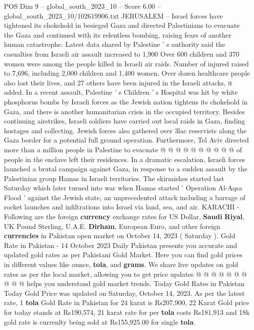 \begin{textsample}{POS Dim 9 – global\_south\_2023\_10 – Score 6.00 – global\_south\_2023\_10/102619906.txt}  \label{ex:f9_pos_081}
JERUSALEM -- Israel forces have tightened its chokehold in besieged Gaza and directed Palestinians to evacuate the Gaza and continued with its relentless bombing, raising fears of another human catastrophe.
Latest data shared by Palestine ' s authority said the casualties from Israeli air assault increased to 1,900 Over 600 children and 370 women were among the people killed in Israeli air raids.
Number of injured raised to 7,696, including 2,000 children and 1,400 women.
Over dozen healthcare people also lost their lives, and 27 others have been injured in the Israeli attacks, it added.
In a recent assault, Palestine ' s Children ' s Hospital was hit by white phosphorus bombs by Israeli forces as the Jewish nation tightens its chokehold in Gaza, and there is another humanitarian crisis in the occupied territory.
Besides continuing airstrikes, Israeli soldiers have carried out local raids in Gaza, finding hostages and collecting.
Jewish forces also gathered over 3lac reservists along the Gaza border for a potential full ground operation.
Furthermore, Tel Aviv directed more than a million people in Palestine to evacuate @ @ @ @ @ @ @ @ @ @ of people in the enclave left their residences.
In a dramatic escalation, Israeli forces launched a brutal campaign against Gaza, in response to a sudden assault by the Palestinian group Hamas in Israeli territories.
The skirmishes started last Saturday which later turned into war when Hamas started ' Operation Al-Aqsa Flood ' against the Jewish state, an unprecedented attack including a barrage of rocket launches and infiltrations into Israel via land, sea, and air.
KARACHI - Following are the foreign \textbf{currency} exchange rates for US Dollar, \textbf{Saudi} \textbf{Riyal}, UK Pound Sterling, U.A.E. \textbf{Dirham}, European Euro, and other foreign \textbf{currencies} in Pakistan open market on October 14, 2023 ( Saturday ).
Gold Rate in Pakistan - 14 October 2023 Daily Pakistan presents you accurate and updated gold rates as per Pakistani Gold Market.
Here you can find gold prices in different values like ounce, \textbf{tola}, and \textbf{grams}.
We share live updates on gold rates as per the local market, allowing you to get price updates @ @ @ @ @ @ @ @ @ @ helps you understand gold market trends.
Today Gold Rates in Pakistan Today Gold Price was updated on Saturday, October 14, 2023.
As per the latest rate, 1 \textbf{tola} Gold Rate in Pakistan for 24 karat is Rs207,900, 22 Karat Gold price for today stands at Rs190,574, 21 karat rate for per \textbf{tola} costs Rs181,913 and 18k gold rate is currenlty being sold at Rs155,925.00 for single \textbf{tola}.

\end{textsample}

